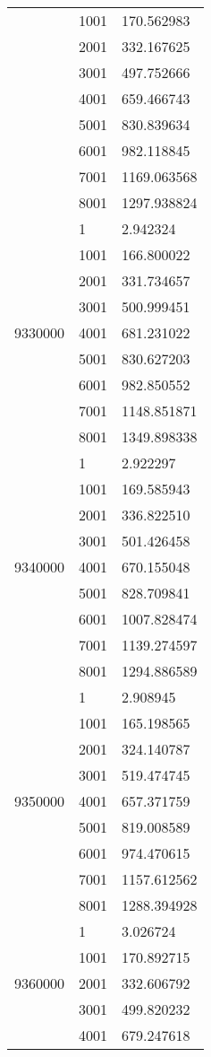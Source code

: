 \begin{table}[htb!]
\begin{tabular}{lll}
 & 1001 & 170.562983 \\
 & 2001 & 332.167625 \\
 & 3001 & 497.752666 \\
 & 4001 & 659.466743 \\
 & 5001 & 830.839634 \\
 & 6001 & 982.118845 \\
 & 7001 & 1169.063568 \\
 & 8001 & 1297.938824 \\
\multirow[c]{9}{*}{9330000} & 1 & 2.942324 \\
 & 1001 & 166.800022 \\
 & 2001 & 331.734657 \\
 & 3001 & 500.999451 \\
 & 4001 & 681.231022 \\
 & 5001 & 830.627203 \\
 & 6001 & 982.850552 \\
 & 7001 & 1148.851871 \\
 & 8001 & 1349.898338 \\
\multirow[c]{9}{*}{9340000} & 1 & 2.922297 \\
 & 1001 & 169.585943 \\
 & 2001 & 336.822510 \\
 & 3001 & 501.426458 \\
 & 4001 & 670.155048 \\
 & 5001 & 828.709841 \\
 & 6001 & 1007.828474 \\
 & 7001 & 1139.274597 \\
 & 8001 & 1294.886589 \\
\multirow[c]{9}{*}{9350000} & 1 & 2.908945 \\
 & 1001 & 165.198565 \\
 & 2001 & 324.140787 \\
 & 3001 & 519.474745 \\
 & 4001 & 657.371759 \\
 & 5001 & 819.008589 \\
 & 6001 & 974.470615 \\
 & 7001 & 1157.612562 \\
 & 8001 & 1288.394928 \\
\multirow[c]{9}{*}{9360000} & 1 & 3.026724 \\
 & 1001 & 170.892715 \\
 & 2001 & 332.606792 \\
 & 3001 & 499.820232 \\
 & 4001 & 679.247618 \\

\end{tabular}
\end{table}
